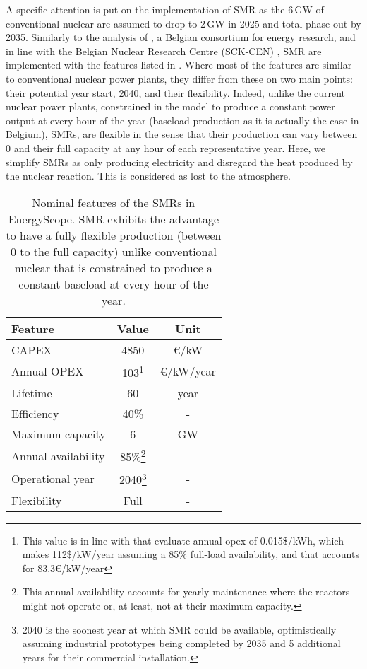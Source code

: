 A specific attention is put on the implementation of \gls{SMR} as the 6\,GW of conventional nuclear are assumed to drop to 2\,GW in 2025 and total phase-out by 2035. Similarly to the analysis of \citet{PATHS2050}, a Belgian consortium for energy research, and in line with the Belgian Nuclear Research Centre (SCK-CEN) \cite{SCK-CEN_SMR}, \gls{SMR} are implemented with the features listed in . Where most of the features are similar to conventional nuclear power plants, they differ from these on two main points: their potential year start, 2040, and their flexibility. Indeed, unlike the current nuclear power plants, constrained in the model to produce a constant power output at every hour of the year (\ie baseload production as it is actually the case in Belgium), SMRs, are flexible in the sense that their production can vary between 0 and their full capacity at any hour of each representative year. Here, we simplify SMRs as only producing electricity and disregard the heat produced by the nuclear reaction. This is considered as lost to the atmosphere.

\begin{table}[htbp!]
\caption{Nominal features of the SMRs in EnergyScope. \gls{SMR} exhibits the advantage to have a fully flexible production (\ie between 0 to the full capacity) unlike conventional nuclear that is constrained to produce a constant baseload at every hour of the year.}
\label{tab:SMR_features}
\begin{minipage}{\linewidth}
\centering
\begin{tabular}{l c c}
\toprule
\textbf{Feature} & \textbf{Value} & \textbf{Unit}\\
\midrule
CAPEX & 4850 & €/kW \\
Annual OPEX & 103\footnote{\label{foot:c_maint_SMR}This value is in line with \citet{smr_canada} that evaluate annual opex of 0.015\$/kWh, which makes 112\$/kW/year assuming a 85\% full-load availability, and \citet{PATHS2050} that accounts for 83.3€/kW/year} & €/kW/year \\
Lifetime & 60 & year \\
Efficiency & 40\% & -\\
Maximum capacity & 6 & GW \\
Annual availability & 85\%\footnote{\label{foot:avail_SMR}This annual availability accounts for yearly maintenance where the reactors might not operate or, at least, not at their maximum capacity. } & -\\
Operational year & 2040\footnote{\label{foot:op_year_SMR}2040 is the soonest year at which \gls{SMR} could be available, optimistically assuming industrial prototypes being completed by 2035 and 5 additional years for their commercial installation.} & - \\
Flexibility & Full & - \\
\bottomrule							

\end{tabular}
\end{minipage}
\end{table}


